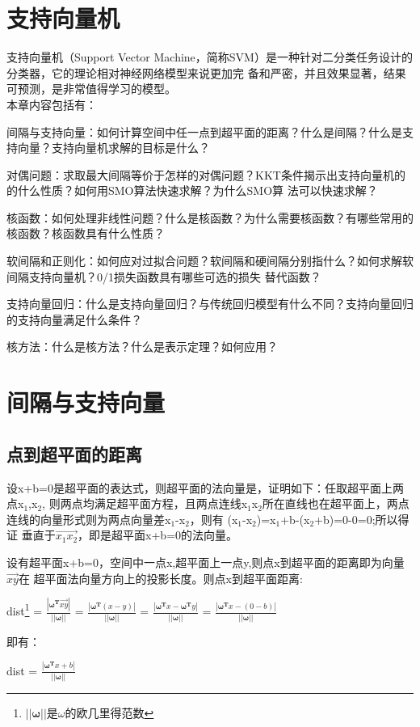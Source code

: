 \documentclass[UTF8]{ctexart}
\begin{document}
\newpage
\tableofcontents
\newpage
\large{
\section{支持向量机}
支持向量机（Support Vector Machine，简称SVM）是一种针对二分类任务设计的分类器，它的理论相对神经网络模型来说更加完
备和严密，并且效果显著，结果可预测，是非常值得学习的模型。\\
本章内容包括有：\par
间隔与支持向量：如何计算空间中任一点到超平面的距离？什么是间隔？什么是支持向量？支持向量机求解的目标是什么？\par
对偶问题：求取最大间隔等价于怎样的对偶问题？KKT条件揭示出支持向量机的的什么性质？如何用SMO算法快速求解？为什么SMO算
法可以快速求解？\par
核函数：如何处理非线性问题？什么是核函数？为什么需要核函数？有哪些常用的核函数？核函数具有什么性质？\par
软间隔和正则化：如何应对过拟合问题？软间隔和硬间隔分别指什么？如何求解软间隔支持向量机？0/1损失函数具有哪些可选的损失
替代函数？\par
支持向量回归：什么是支持向量回归？与传统回归模型有什么不同？支持向量回归的支持向量满足什么条件？\par
核方法：什么是核方法？什么是表示定理？如何应用？\newpage

\section{间隔与支持向量}
\subsection{点到超平面的距离}
设x+b=0是超平面的表达式，则超平面的法向量是\bm{$\omega$}，证明如下：任取超平面上两点x$_1$,x$_2$,
则两点均满足超平面方程，且两点连线x$_1$x$_2$所在直线也在超平面上，两点连线的向量形式则为两点向量差x$_1$-x$_2$，则有
(x$_1$-x$_2$)=x$_1$+b-(x$_2$+b)=0-0=0;所以得证\bm{$\omega$}
垂直于$\overrightarrow{x_1x_2}$，即\bm{$\omega$}是超平面x+b=0的法向量。\par

设有超平面x+b=0，空间中一点x,超平面上一点y,则点x到超平面的距离即为向量$\overrightarrow{xy}$在
超平面法向量\bm{$\omega$}方向上的投影长度。则点x到超平面距离:\par

\begin{center}
    {\Large dist\footnote{$||\bm{\omega}||$是$\omega$的欧几里得范数}
                 = $\frac{|\bm{\omega^T}\overrightarrow{xy}|}{||\bm{\omega}||}$
                 = $\frac{|\bm{\omega^T}{(x-y)}|}{||\bm{\omega}||}$
                 = $\frac{|\bm{\omega^T}x-\bm{\omega^T}y|}{||\bm{\omega}||}$
                 = $\frac{|\bm{\omega^T}x-(0-b)|}{||\bm{\omega}||}$}
\end{center}
即有：
\begin{center}
    {\Large dist = $\frac{|\bm{\omega^T}x+b|}{||\bm{\omega}||}$}
\end{center}

}
\end{document}
